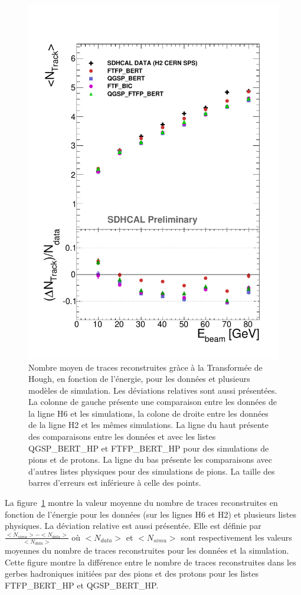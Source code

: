 \begin{figure}[!ht]
  \includegraphics[width=.44\textwidth]{Shower/figs/NTRACK_PION_MODEL_NOV.pdf}
  \caption{Nombre moyen de traces reconstruites gràce à la Transformée de Hough, en fonction de l'énergie, pour les données et plusieurs modèles de simulation. Les déviations relatives sont aussi présentées. La colonne de gauche présente une comparaison entre les données de la ligne H6 et les simulations, la colone de droite entre les données de la ligne H2 et les mêmes simulations. La ligne du haut présente des comparaisons entre les données et avec les listes QGSP\_BERT\_HP et FTFP\_BERT\_HP pour des simulations de pions et de protons. La ligne du bas présente les comparaisons avec d'autres listes physiques pour des simulations de pions. La taille des barres d'erreurs est inférieure à celle des points.}
  \label{fig.ntrack_pi-_ebeam}
\end{figure}

La figure~\ref{fig.ntrack_pi-_ebeam} montre la valeur moyenne du nombre de traces reconstruites en fonction de l'énergie pour les données (sur les lignes H6 et H2) et plusieurs listes physiques. La déviation relative est aussi présentée. Elle est définie par $\frac{<N_{simu}>-<N_{data}>}{<N_{data}>}$ où $<N_{data}>$ et $<N_{simu}>$ sont respectivement les valeurs moyennes du nombre de traces reconstruites pour les données et la simulation. Cette figure montre la différence entre le nombre de traces reconstruites dans les gerbes hadroniques initiées par des pions et des protons pour les listes FTFP\_BERT\_HP et QGSP\_BERT\_HP. 

